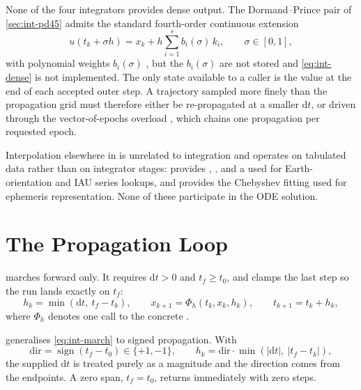 None of the four integrators provides dense output. The Dormand--Prince pair
of \cref{sec:int-pd45} admits the standard fourth-order continuous extension
\begin{equation}
  \label{eq:int-dense}
  u(t_k + \sigma h) = x_k + h \sum_{i=1}^{s} b_i(\sigma)\, k_i,
  \qquad \sigma \in [0,1],
\end{equation}
with polynomial weights $b_i(\sigma)$ \citep[Ch.~II.6]{hairer1993}, but the
$b_i(\sigma)$ are not stored and \cref{eq:int-dense} is not implemented. The
only state available to a caller is the value at the end of each accepted
outer step. A trajectory sampled more finely than the propagation grid must
therefore either be re-propagated at a smaller $\mathrm{d}t$, or driven
through the vector-of-epochs overload
, which chains one propagation per
requested epoch.

Interpolation elsewhere in \lupnt{} is unrelated to integration and operates
on tabulated data rather than on integrator stages:
 provides ,
, and a  used for
Earth-orientation and IAU series lookups, and
 provides the Chebyshev fitting used for
ephemeris representation. None of these participate in the ODE solution.

\section{The Propagation Loop}
\label{sec:int-loop}

 marches forward only. It requires
$\mathrm{d}t > 0$ and $t_f \ge t_0$, and clamps the last step so the run lands
exactly on $t_f$:
\begin{equation}
  \label{eq:int-march}
  h_k = \min\!\left(\mathrm{d}t,\ t_f - t_k\right),
  \qquad
  x_{k+1} = \Phi_h(t_k, x_k, h_k),
  \qquad
  t_{k+1} = t_k + h_k,
\end{equation}
where $\Phi_h$ denotes one call to the concrete .

 generalises \cref{eq:int-march} to signed propagation. With
\begin{equation}
  \label{eq:int-dir}
  \mathrm{dir} = \operatorname{sign}(t_f - t_0) \in \{+1, -1\},
  \qquad
  h_k = \mathrm{dir} \cdot \min\!\left(
    |\mathrm{d}t|,\ |t_f - t_k| \right),
\end{equation}
the supplied $\mathrm{d}t$ is treated purely as a magnitude and the direction
comes from the endpoints. A zero span, $t_f = t_0$, returns immediately with
zero steps.

